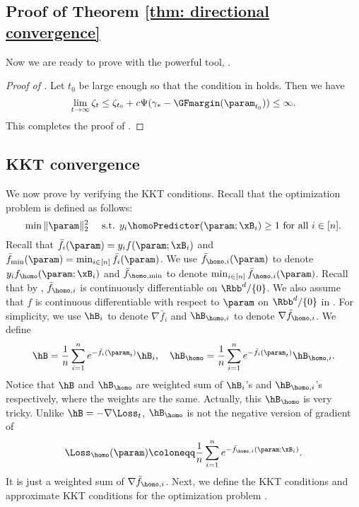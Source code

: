 \subsection{Proof of Theorem \ref{thm: directional convergence}}
\label{sec:direct-conv:direct-proof}

Now we are ready to prove  with the powerful tool, . 
\begin{proof}[Proof of ]
Let $t_0$ be large enough so that the condition in  holds. Then we have  
\[
    \lim_{t\to \infty} \zeta_t \le \zeta_{t_0} + c \Psi( \gamma_* - \GFmargin(\param_{t_0})) \le \infty.
\]
This completes the proof of .
\end{proof}

\subsection{KKT convergence} \label{sec:proof:KKT}

We now prove  by verifying the KKT conditions. Recall that the optimization problem  is defined as follows: 
\[
    \min  \| \param\|_2^2 \quad \text{ s.t. } y_i \homoPredictor (\param;\xB_i) \ge 1 \text{ for all } i\in [n]. 
\]
Recall that $\bar f_{i}(\param) = y_i f(\param;\xB_i)$ and $\bar f_{\min}(\param) = \min_{i\in [n]} \bar f_{i}(\param)$.  
We use $\bar f_{\homo,i}(\param)$ to denote $y_i f_\homo(\param;\xB_i)$ and   $\bar f_{\homo,\min}$ to denote $\min_{i\in [n]} \bar f_{\homo,i}(\param)$. Recall that by , $\bar f_{\homo,i}$ is continuously differentiable on $\Rbb^d / \{0\}$. We also assume that $f$ is continuous differentiable with respect to $\param$ on $\Rbb^d / \{0\}$ in . 
For simplicity, we use $\hB_i$ to denote $\nabla \bar f_i$ and $\hB_{\homo,i}$ to denote $\nabla \bar  f_{\homo,i}$. 
We define
\[
    \hB = \frac{1}{n} \sum_{i=1}^n e^{- \bar f_{i}(\param_t)}\hB_i, \quad \hB_{\homo} = \frac{1}{n} \sum_{i=1}^n e^{- \bar f_{i}(\param_t)}\hB_{\homo,i}.
\]
Notice that $\hB$ and $\hB_{\homo}$ are weighted sum of $\hB_i$'s and $\hB_{\homo,i}$'s respectively, where the weights are the same. 
Actually, this $\hB_{\homo}$ is very tricky. Unlike $\hB = - \nabla \Loss_t$, $\hB_{\homo}$ is not the negative version of gradient of 
\[
\Loss_{\homo}(\param) \coloneqq \frac{1}{n} \sum_{i=1}^n e^{- \bar f_{\homo,i}(\param;\xB_i)}. 
\] 
It is just a weighted sum of  $\nabla \bar f_{\homo,i}$. Next, we define the KKT conditions and approximate KKT conditions for the optimization problem . 

